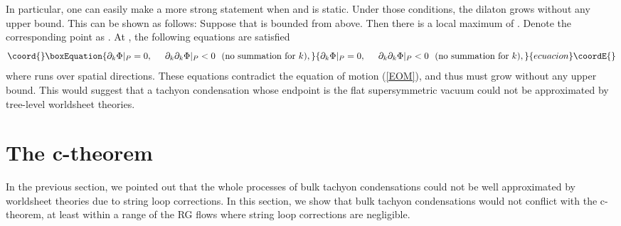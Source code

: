 \documentclass[a4paper,a4paper]{article}
\begin{document}
In particular, one can easily make a more strong statement when \coordHE{} and \myHighlight{$\Phi$}\coordHE{} is static. 
Under those conditions, the dilaton \myHighlight{$\Phi$}\coordHE{} grows without any upper bound. 
This can be shown as follows: 
Suppose that \myHighlight{$\Phi$}\coordHE{} is bounded from above. 
Then there is a local maximum of \myHighlight{$\Phi$}\coordHE{}. 
Denote the corresponding point as \coordHE{}. 
At \coordHE{}, the following equations are satisfied
\begin{equation}\coord{}\boxEquation{
\partial_k\Phi|_P=0, \hspace{5mm} \partial_k\partial_k\Phi|_P<0\ \ (\mbox{no summation for }k),
}{
\partial_k\Phi|_P=0, \hspace{5mm} \partial_k\partial_k\Phi|_P<0\ \ (\mbox{no summation for }k),
}{ecuacion}\coordE{}\end{equation}
where \coordHE{} runs over spatial directions. 
These equations contradict the equation of motion (\ref{EOM}), and thus \myHighlight{$\Phi$}\coordHE{} must grow without any upper bound. 
This would suggest that a tachyon condensation whose endpoint is the flat supersymmetric vacuum could not be 
approximated by tree-level worldsheet theories. 






















\vspace{1cm}

\section{The c-theorem}  \label{c}

\vspace{5mm}

In the previous section, we pointed out that the whole processes of bulk tachyon condensations could not be well 
approximated by worldsheet theories due to string loop corrections. 
In this section, we show that bulk tachyon condensations would not conflict with the c-theorem, at least 
within a range 
of the RG flows where string loop corrections are negligible. 
\end{document}
